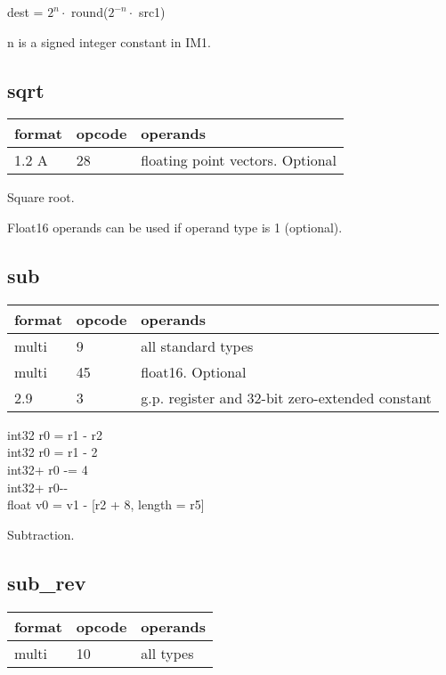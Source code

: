 \documentclass[forwardcom.tex]{subfiles}
\begin{document}
dest = $2^n\cdot$ round($2^{-n}\cdot$ src1)

n is a signed integer constant in IM1.
\vv


\subsection{sqrt}
\label{table:sqrtInstruction}
\begin{tabular}{|p{12mm}|p{15mm}|p{100mm}|}
\hline
\bfseries format & \bfseries opcode & \bfseries operands \\ \hline
1.2 A & 28 & floating point vectors. Optional \\ \hline
\end{tabular}
\vv

Square root.
\vv

Float16 operands can be used if operand type is 1 (optional).
\vv


\subsection{sub}
\label{table:subInstruction}
\begin{tabular}{|p{12mm}|p{15mm}|p{100mm}|}
\hline
\bfseries format & \bfseries opcode & \bfseries operands \\ \hline
multi &  9 & all standard types \\ \hline
multi & 45 & float16. Optional \\ \hline
2.9   &  3 & g.p. register and 32-bit zero-extended constant \\ \hline
\end{tabular}
\vv

int32 r0 = r1 - r2 \\
int32 r0 = r1 - 2 \\
int32+ r0 -= 4 \\
int32+ r0-{-} \\
float v0 = v1 - [r2 + 8, length = r5]
\vv

Subtraction.
\vv


\subsection{sub\_rev}
\label{table:subRevInstruction}
\begin{tabular}{|p{12mm}|p{15mm}|p{100mm}|}
\hline
\bfseries format & \bfseries opcode & \bfseries operands \\ \hline
multi & 10 & all types \\ \hline
\end{tabular}
\vv
\end{document}
